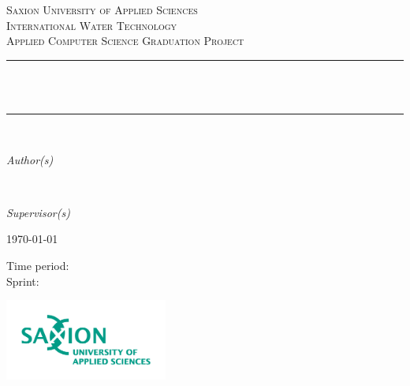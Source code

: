 \begin{titlepage}
  	\newcommand{\HRule}{\rule{\linewidth}{0.3mm}}
	\center
	\textsc{\LARGE Saxion University of Applied Sciences}\\[1.5cm]
	\textsc{\Large International Water Technology}\\[0.5cm]
	\textsc{\large Applied Computer Science Graduation Project}\\[0.5cm]
	\HRule\\[0.4cm]
	{\huge\bfseries \@title}\\[0.4cm]
	\HRule\\[1.5cm]

	\begin{minipage}{0.4\textwidth}
		\begin{flushleft}
			\large
			\textit{Author(s)}\\
			\@author %
		\end{flushleft}
	\end{minipage}
	~
	\begin{minipage}{0.4\textwidth}
		\begin{flushright}
			\large
			\textit{Supervisor(s)}\\
			\supervisors
		\end{flushright}
	\end{minipage}
	

	\vfill\vfill
		{\large\today}
    \vfill\vfill
    
    \footnotesize{Time period: \timePeriod}
    \\[0.3cm]
    \footnotesize{Sprint: \sprint}
    \vfill
    \homepage
    
    \vfill
    
    
	
	\vfill\vfill
	\includegraphics[width=0.4\textwidth]{./03_saxionlogo.png}
	\vfill
	 
	\vfill
	
\end{titlepage}

